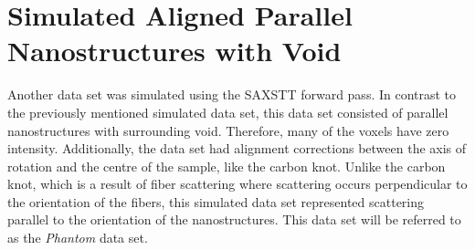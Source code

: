 


\section{Simulated Aligned Parallel Nanostructures with Void}
\label{sec:aligned_parallel_nanostructures_in_air}
Another data set was simulated using the SAXSTT forward pass. In contrast to the previously mentioned simulated data set,
this data set consisted of parallel nanostructures with surrounding void. Therefore, many of the voxels have zero intensity.
Additionally, the data set had alignment corrections between the axis of rotation and the centre of the sample, like the carbon knot.
Unlike the carbon knot, which is a result of fiber scattering where scattering occurs perpendicular to the orientation of the fibers,
this simulated data set represented scattering parallel to the orientation of the nanostructures.
This data set will be referred to as the \emph{Phantom} data set.


